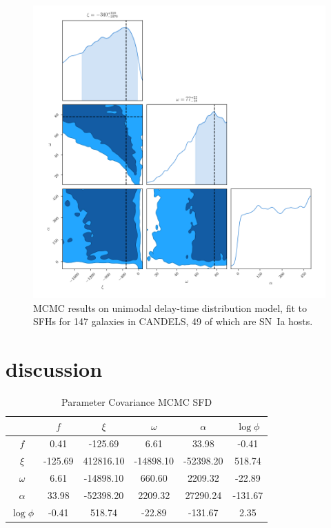 \documentclass[apj]{aastex}
\begin{document}
\begin{figure}[t] %
   \centering
   \includegraphics[width=6.5in]{figure_sfh_corners} 
   \caption{\footnotesize MCMC results on unimodal delay-time distribution model, fit to SFHs for 147 galaxies in CANDELS, 49 of which are SN~Ia hosts.}
   \label{fig:mcmc_sfd}
\end{figure}

\section{discussion}

{}

\begin{table}
    \centering
    \caption{Parameter Covariance MCMC SFD}
    \label{tab:parameter_covariance}
    \begin{tabular}{c|ccccc}
         & $f$ & $\xi$ & $\omega$ & $\alpha$ & $\log \phi$\\ 
        \hline
              $f$ &  0.41 & -125.69 &  6.61 & 33.98 & -0.41 \\ 
            $\xi$ & -125.69 & 412816.10 & -14898.10 & -52398.20 & 518.74 \\ 
         $\omega$ &  6.61 & -14898.10 & 660.60 & 2209.32 & -22.89 \\ 
         $\alpha$ & 33.98 & -52398.20 & 2209.32 & 27290.24 & -131.67 \\ 
        $\log \phi$ & -0.41 & 518.74 & -22.89 & -131.67 &  2.35 \\ 
        \hline
    \end{tabular}
\end{table}
\end{document}
